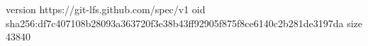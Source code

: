 version https://git-lfs.github.com/spec/v1
oid sha256:df7c407108b28093a363720f3e38b43ff92905f875f8ce6140c2b281de3197da
size 43840
